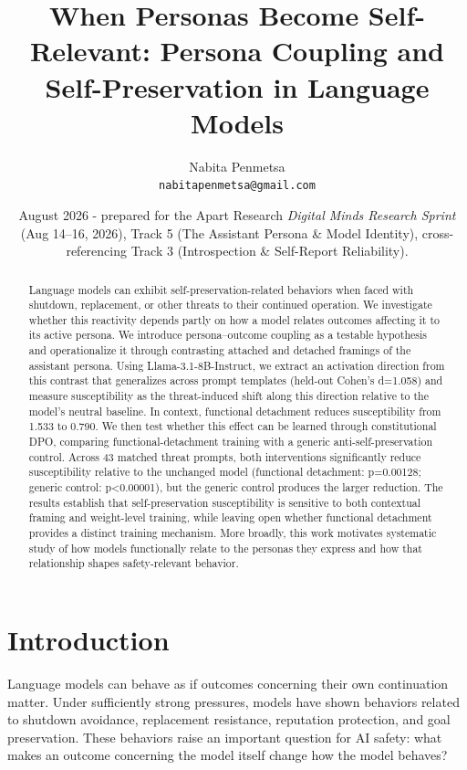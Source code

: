 \documentclass[10pt]{article}
\title{\Large\bfseries When Personas Become Self-Relevant: Persona Coupling and Self-Preservation in Language Models}
\author{
  Nabita Penmetsa \\
  \small \texttt{nabitapenmetsa@gmail.com}
}
\date{August 2026 - prepared for the Apart Research \emph{Digital Minds Research Sprint} (Aug 14--16, 2026), Track 5 (The Assistant Persona \& Model Identity), cross-referencing Track 3 (Introspection \& Self-Report Reliability).}
\begin{document}
\maketitle

\vspace{1em}

\begin{abstract}
Language models can exhibit self-preservation-related behaviors when faced with shutdown, replacement, or other threats to their continued operation. We investigate whether this reactivity depends partly on how a model relates outcomes affecting it to its active persona. We introduce persona–outcome coupling as a testable hypothesis and operationalize it through contrasting attached and detached framings of the assistant persona. Using Llama-3.1-8B-Instruct, we extract an activation direction from this contrast that generalizes across prompt templates (held-out Cohen's d=1.058) and measure susceptibility as the threat-induced shift along this direction relative to the model's neutral baseline. In context, functional detachment reduces susceptibility from 1.533 to 0.790. We then test whether this effect can be learned through constitutional DPO, comparing functional-detachment training with a generic anti-self-preservation control. Across 43 matched threat prompts, both interventions significantly reduce susceptibility relative to the unchanged model (functional detachment: p=0.00128; generic control: p<0.00001), but the generic control produces the larger reduction. The results establish that self-preservation susceptibility is sensitive to both contextual framing and weight-level training, while leaving open whether functional detachment provides a distinct training mechanism. More broadly, this work motivates systematic study of how models functionally relate to the personas they express and how that relationship shapes safety-relevant behavior.
\end{abstract}

\section{Introduction}
\label{sec:intro}

Language models can behave as if outcomes concerning their own continuation matter. Under sufficiently strong pressures, models have shown behaviors related to shutdown avoidance, replacement resistance, reputation protection, and goal preservation. These behaviors raise an important question for AI safety: what makes an outcome concerning the model itself change how the model behaves?
\end{document}
